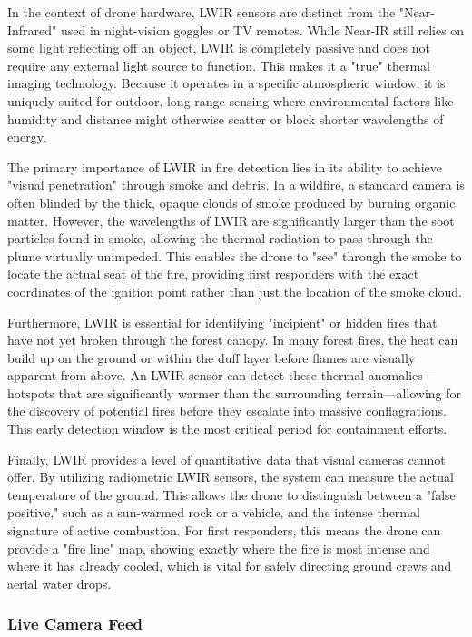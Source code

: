 \documentclass[journal, onecolumn]{IEEEtran}
\begin{document}
In the context of drone hardware, LWIR sensors are distinct from the "Near-Infrared" used in night-vision goggles or TV remotes. While Near-IR still relies on some light reflecting off an object, LWIR is completely passive and does not require any external light source to function. This makes it a "true" thermal imaging technology. Because it operates in a specific atmospheric window, it is uniquely suited for outdoor, long-range sensing where environmental factors like humidity and distance might otherwise scatter or block shorter wavelengths of energy.


The primary importance of LWIR in fire detection lies in its ability to achieve "visual penetration" through smoke and debris. In a wildfire, a standard camera is often blinded by the thick, opaque clouds of smoke produced by burning organic matter. However, the wavelengths of LWIR are significantly larger than the soot particles found in smoke, allowing the thermal radiation to pass through the plume virtually unimpeded. This enables the drone to "see" through the smoke to locate the actual seat of the fire, providing first responders with the exact coordinates of the ignition point rather than just the location of the smoke cloud.


Furthermore, LWIR is essential for identifying "incipient" or hidden fires that have not yet broken through the forest canopy. In many forest fires, the heat can build up on the ground or within the duff layer before flames are visually apparent from above. An LWIR sensor can detect these thermal anomalies—hotspots that are significantly warmer than the surrounding terrain—allowing for the discovery of potential fires before they escalate into massive conflagrations. This early detection window is the most critical period for containment efforts.


Finally, LWIR provides a level of quantitative data that visual cameras cannot offer. By utilizing radiometric LWIR sensors, the system can measure the actual temperature of the ground. This allows the drone to distinguish between a "false positive," such as a sun-warmed rock or a vehicle, and the intense thermal signature of active combustion. For first responders, this means the drone can provide a "fire line" map, showing exactly where the fire is most intense and where it has already cooled, which is vital for safely directing ground crews and aerial water drops.

\vspace{1em}

\subsubsection{Live Camera Feed}
\end{document}
